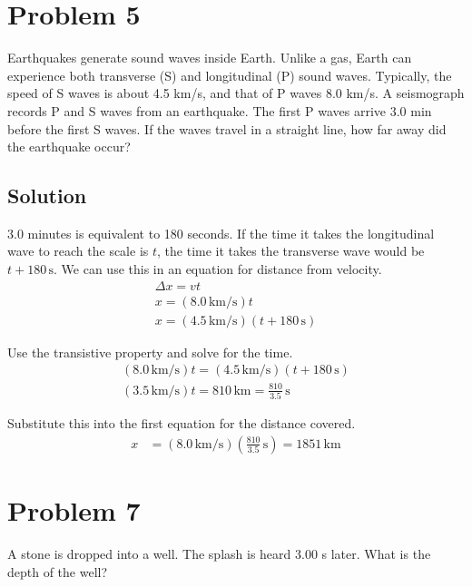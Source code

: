 \documentclass[12pt]{article}
\begin{document}
    \pagebreak
    \section{Problem 5}
        Earthquakes generate sound waves inside Earth.
        Unlike a gas, Earth can experience both transverse (S) and longitudinal (P) sound waves. 
        Typically, the speed of S waves is about 4.5 km/s, and that of P waves 8.0 km/s. 
        A seismograph records P and S waves from an earthquake. 
        The first P waves arrive 3.0 min before the first S waves. 
        If the waves travel in a straight line, how far away did the earthquake occur?

        \subsection{Solution}
            3.0 minutes is equivalent to 180 seconds.
            If the time it takes the longitudinal wave to reach the scale is $t$, the time it takes the transverse wave would be $t + 180\,\unit{\second}$. 
            We can use this in an equation for distance from velocity.
            \begin{gather}
                \Delta x    =   vt\\
                x   =   (8.0\,\unit{\kilo\meter/\second})t\\
                x   =   (4.5\,\unit{\kilo\meter/\second})(t + 180\,\unit{\second})
            \end{gather}

            Use the transistive property and solve for the time.
            \begin{gather}
                (8.0\,\unit{\kilo\meter/\second})t  =   (4.5\,\unit{\kilo\meter/\second})(t + 180\,\unit{\second})\\
                (3.5\,\unit{\kilo\meter/\second})t  =   810\,\unit{\kilo\meter}
                    =   \frac{810}{3.5}\,\unit{\second}
            \end{gather}
            
            Substitute this into the first equation for the distance covered.
            \begin{align}
                x   &=  (8.0\,\unit{\kilo\meter/\second})(\frac{810}{3.5}\,\unit{\second})
                    =   \boxed{1851\,\unit{\kilo\meter}}
            \end{align}

    \pagebreak
    \section{Problem 7}
        A stone is dropped into a well. 
        The splash is heard 3.00 s later. 
        What is the depth of the well?
\end{document}

